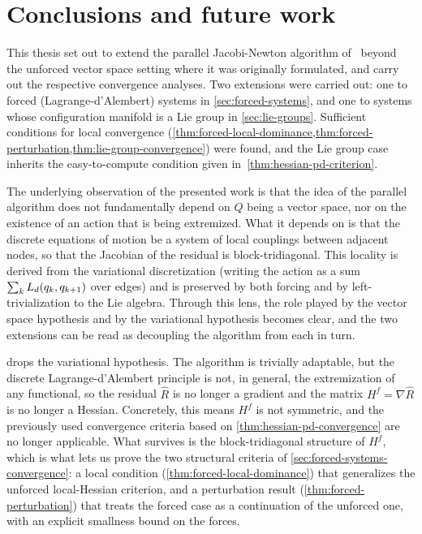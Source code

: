 \chapter{Conclusions and future work}\label{sec:conclusion}

This thesis set out to extend the parallel Jacobi-Newton algorithm of~\cite{ferraroParallelIterativeMethod2025} beyond the unforced vector space setting where it was originally formulated, and carry out the respective convergence analyses. Two extensions were carried out: one to forced (Lagrange-d'Alembert) systems in \cref{sec:forced-systems}, and one to systems whose configuration manifold is a Lie group in \cref{sec:lie-groups}. Sufficient conditions for local convergence (\cref{thm:forced-local-dominance,thm:forced-perturbation,thm:lie-group-convergence}) were found, and the Lie group case inherits the easy-to-compute condition given in~\cref{thm:hessian-pd-criterion}.

The underlying observation of the presented work is that the idea of the parallel algorithm does not fundamentally depend on $Q$ being a vector space, nor on the existence of an action that is being extremized. What it depends on is that the discrete equations of motion be a system of local couplings between adjacent nodes, so that the Jacobian of the residual is block-tridiagonal. This locality is derived from the variational discretization (writing the action as a sum $\sum_k L_d(q_k, q_{k+1})$ over edges) and is preserved by both forcing and by left-trivialization to the Lie algebra. Through this lens, the role played by the vector space hypothesis and by the variational hypothesis becomes clear, and the two extensions can be read as decoupling the algorithm from each in turn.

 drops the variational hypothesis. The algorithm is trivially adaptable, but the discrete Lagrange-d'Alembert principle is not, in general, the extremization of any functional, so the residual $\hat R$ is no longer a gradient and the matrix $H^f = \nabla \hat{R}$ is no longer a Hessian. Concretely, this means $H^f$ is not symmetric, and the previously used convergence criteria based on \cref{thm:hessian-pd-convergence} are no longer applicable. What survives is the block-tridiagonal structure of $H^f$, which is what lets us prove the two structural criteria of \cref{sec:forced-systems-convergence}: a local condition (\cref{thm:forced-local-dominance}) that generalizes the unforced local-Hessian criterion, and a perturbation result (\cref{thm:forced-perturbation}) that treats the forced case as a continuation of the unforced one, with an explicit smallness bound on the forces.

